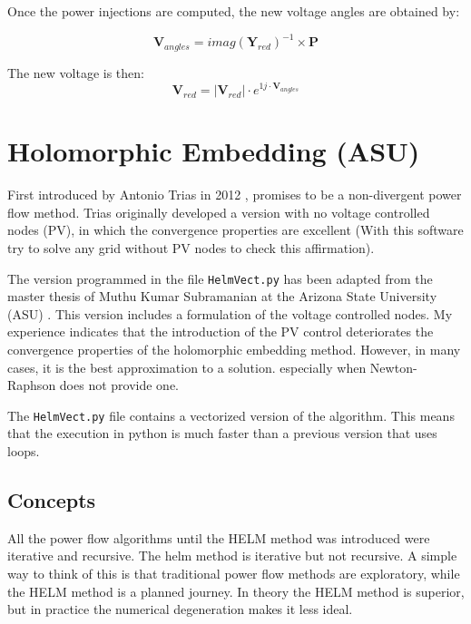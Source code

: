 \documentclass[11pt,fleqn]{book} %
\begin{document}
Once the power injections are computed, the new voltage angles are obtained by:

\begin{equation}
\textbf{V}_{angles} = imag(\textbf{Y}_{red})^{-1} \times \textbf{P}
\end{equation}

The new voltage is then:
\begin{equation}
\textbf{V}_{red} = |\textbf{V}_{red}| \cdot e^{1j \cdot  \textbf{V}_{angles}}
\end{equation}


\newpage
\section{Holomorphic Embedding (ASU)}

First introduced by Antonio Trias in 2012 \cite{TriasHELM}, promises to be a non-divergent power flow method. Trias originally developed a version with no voltage controlled nodes (PV), in which the convergence properties are excellent (With this software try to solve any grid without PV nodes to check this affirmation). 

The version programmed in the file \verb|HelmVect.py| has been adapted from the master thesis of Muthu Kumar Subramanian at the Arizona State University (ASU) \cite{subramanian2014application}. This version includes a formulation of the voltage controlled nodes. My experience indicates that the introduction of the PV control deteriorates the convergence properties of the holomorphic embedding method. However, in many cases, it is the best approximation to a solution. especially when Newton-Raphson does not provide one.

The \verb|HelmVect.py|  file contains a vectorized version of the algorithm. This means that the execution in python is much faster than a previous version that uses loops.

\subsection{Concepts}

All the power flow algorithms until the HELM method was introduced were iterative and recursive. The helm method is iterative but not recursive. A simple way to think of this is that traditional power flow methods are exploratory, while the HELM method is a planned journey. In theory the HELM method is superior, but in practice the numerical degeneration makes it less ideal.
\end{document}
